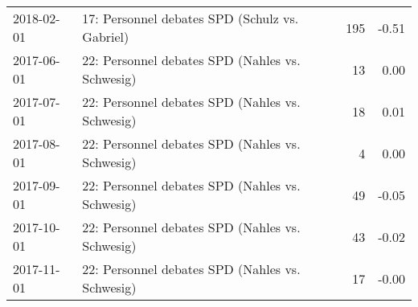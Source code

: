 \begin{table}[ht]
\begin{tabular}{llrr}
  2018-02-01 & 17: Personnel debates SPD (Schulz vs. Gabriel) & 195 & -0.51 \\ 
  2017-06-01 & 22: Personnel debates SPD (Nahles vs. Schwesig) &  13 & 0.00 \\ 
  2017-07-01 & 22: Personnel debates SPD (Nahles vs. Schwesig) &  18 & 0.01 \\ 
  2017-08-01 & 22: Personnel debates SPD (Nahles vs. Schwesig) &   4 & 0.00 \\ 
  2017-09-01 & 22: Personnel debates SPD (Nahles vs. Schwesig) &  49 & -0.05 \\ 
  2017-10-01 & 22: Personnel debates SPD (Nahles vs. Schwesig) &  43 & -0.02 \\ 
  2017-11-01 & 22: Personnel debates SPD (Nahles vs. Schwesig) &  17 & -0.00 \\ 
   \hline
\end{tabular}
\end{table}
